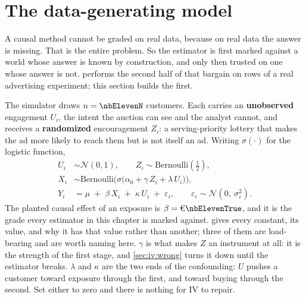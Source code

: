 \section{The data-generating model}
\label{sec:iv:dgm}

A causal method cannot be graded on real data, because on real data the answer is missing. That
is the entire problem. So the estimator is first marked against a world whose answer is known by
construction, and only then trusted on one whose answer is not.  performs the
second half of that bargain on \nbElevenBNFull{} rows of a real advertising experiment; this
section builds the first.

The simulator draws $n = \nbElevenN$ customers. Each carries an \textbf{unobserved} engagement
$U_i$, the intent the auction can see and the analyst cannot, and receives a
\textbf{randomized} encouragement $Z_i$: a serving-priority lottery that makes the ad more likely
to reach them but is not itself an ad. Writing $\sigma(\cdot)$ for the logistic function,
%
\begin{align}
  U_i &\sim \mathcal N(0, 1), \qquad Z_i \sim \text{Bernoulli}(\tfrac12),
        \label{eq:iv:latent}\\
  X_i &\sim \text{Bernoulli}\Big(\sigma\big(\alpha_0 + \gamma\,Z_i + \lambda\,U_i\big)\Big),
        \label{eq:iv:first}\\
  Y_i &= \mu \;+\; \beta\,X_i \;+\; \kappa\,U_i \;+\; \varepsilon_i,
        \qquad \varepsilon_i \sim \mathcal N\!\left(0,\ \sigma_\varepsilon^{2}\right).
        \label{eq:iv:dgp}
\end{align}
%
The planted causal effect of an exposure is $\beta = \eur{\nbElevenTrue}$, and it is the grade
every estimator in this chapter is marked against.  gives every constant, its
value, and why it has that value rather than another; three of them are load-bearing and are worth
naming here. $\gamma$ is what makes $Z$ an instrument at all: it is the strength of the first
stage, and \cref{sec:iv:wrong} turns it down until the estimator breaks. $\lambda$ and $\kappa$
are the two ends of the confounding: $U$ pushes a customer toward exposure through the first, and
toward buying through the second. Set either to zero and there is nothing for IV to repair.



